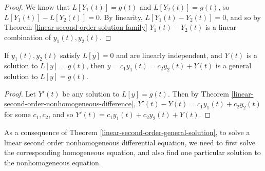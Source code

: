 \begin{proof}
    We know that $L[Y_1(t)] = g(t)$ and $L[Y_2(t)] = g(t)$, so $L[Y_1(t)] - L[Y_2(t)] = 0$. By linearity, $L[Y_1(t) - Y_2(t)] = 0$, and so by Theorem \ref{linear-second-order-solution-family} $Y_1(t) - Y_2(t)$ is a linear combination of $y_1(t), y_2(t)$.
\end{proof}

\begin{thm}\label{lienar}
    If $y_1(t), y_2(t)$ satisfy $L[y] = 0$ and are linearly independent, and $Y(t)$ is a solution to $L[y] = g(t)$, then $y = c_1y_1(t) = c_2y_2(t) + Y(t)$ is a general solution to $L[y] = g(t)$.
\end{thm}

\begin{proof}\label{linear-second-order-general-solution}
    Let $Y'(t)$ be any solution to $L[y] = g(t)$. Then by Theorem \ref{linear-second-order-nonhomogeneous-difference}, $Y'(t) - Y(t) = c_1y_1(t) + c_2y_2(t)$ for some $c_1, c_2$, and so $Y'(t) = c_1y_1(t) + c_2y_2(t) + Y(t)$.
\end{proof}

\begin{rmk}
    As a consequence of Theorem \ref{linear-second-order-general-solution}, to solve a linear second order nonhomogeneous differential equation, we need to first solve the corresponding homogeneous equation, and also find one particular solution to the nonhomogeneous equation.
\end{rmk}
